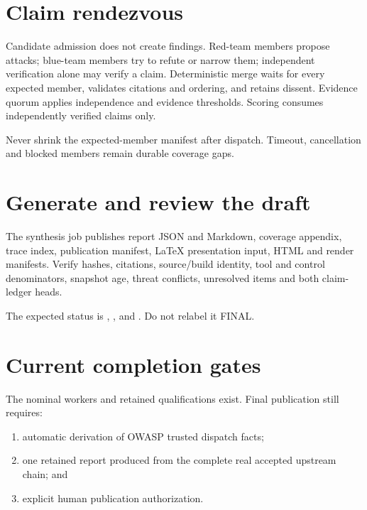 \documentclass[10pt,a4paper]{article}
\begin{document}
\section{Claim rendezvous}
Candidate admission does not create findings. Red-team members propose attacks; blue-team members
try to refute or narrow them; independent verification alone may verify a claim. Deterministic merge
waits for every expected member, validates citations and ordering, and retains dissent. Evidence
quorum applies independence and evidence thresholds. Scoring consumes independently verified claims
only.

Never shrink the expected-member manifest after dispatch. Timeout, cancellation and blocked members
remain durable coverage gaps.

\section{Generate and review the draft}
\begin{terminal}
\end{terminal}

The synthesis job publishes report JSON and Markdown, coverage appendix, trace index, publication
manifest, LaTeX presentation input, HTML and render manifests. Verify hashes,
citations, source/build identity, tool and control denominators, snapshot age, threat conflicts,
unresolved items and both claim-ledger heads.

\begin{danger}
The expected status is , , and
. Do not relabel it FINAL.
\end{danger}

\section{Current completion gates}
The nominal workers and retained qualifications exist. Final publication still requires:
\begin{enumerate}
\item automatic derivation of OWASP trusted dispatch facts;
\item one retained report produced from the complete real accepted upstream chain; and
\item explicit human publication authorization.
\end{enumerate}
\end{document}
